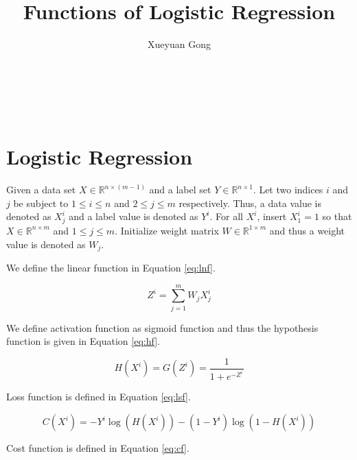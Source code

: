 \documentclass{sig-alternate}
\begin{document}
\title{Functions of Logistic Regression}

\author{
	\alignauthor
	Xueyuan Gong\\
	\\
	\\
    \\
    \\
}

\maketitle

\section{Logistic Regression}

Given a data set $X\in \mathbb{R}^{n\times (m-1)}$ and a label set $Y\in \mathbb{R}^{n\times 1}$. Let two indices $i$ and $j$ be subject to $1\leq i\leq n$ and $2\leq j \leq m$ respectively. Thus, a data value is denoted as $X^{i}_{j}$ and a label value is denoted as $Y^{i}$. For all $X^{i}$, insert $X^{i}_{1}=1$ so that $X\in \mathbb{R}^{n\times m}$ and $1\leq j \leq m$. Initialize weight matrix $W\in \mathbb{R}^{1\times m}$ and thus a weight value is denoted as $W_{j}$.

We define the linear function in Equation \eqref{eq:lnf}.

\begin{equation}
\label{eq:lnf}
	Z^{i}=\sum_{j=1}^{m}W_{j}X^{i}_{j}
\end{equation}

We define activation function as sigmoid function and thus the hypothesis function is given in Equation \eqref{eq:hf}.

\begin{equation}
\label{eq:hf}
	H(X^{i}) = G(Z^{i})=\frac{1}{1+e^{-Z^{i}}}
\end{equation}

Loss function is defined in Equation \eqref{eq:lsf}.

\begin{equation}
\label{eq:lsf}
	C(X^{i})=-Y^{i}\log{(H(X^{i}))}-(1-Y^{i})\log{(1-H(X^{i}))}
\end{equation}

Cost function is defined in Equation \eqref{eq:cf}.
\end{document}
